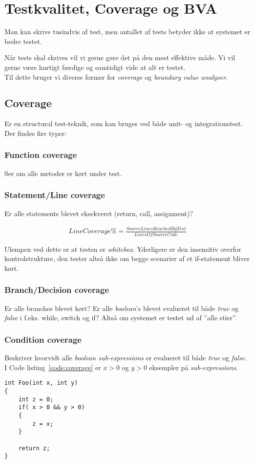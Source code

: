 \section{Testkvalitet, Coverage og BVA}

Man kan skrive tusindvis af test, men antallet af tests betyder ikke at systemet er bedre testet. 

Når tests skal skrives vil vi gerne gøre det på den mest effektive måde. Vi vil gerne være hurtigt færdige og samtidigt vide at alt er testet.\\

Til dette bruger vi diverse former for \textit{coverage} og \textit{boundary value analyser}.

\subsection{Coverage}
Er en structural test-teknik, som kan bruges ved både unit- og integrationstest. Der findes fire typer:

\subsubsection{Function coverage} 
Ser om alle metoder er kørt under test.

\subsubsection{Statement/Line coverage} 
Er alle statements blevet eksekveret (return, call, assignment)? 

\begin{align}
	Line Coverage \% = \frac{Source Lines Reached By Test}{Lines Of Source Code}
\end{align}

Ulempen ved dette er at testen er \textit{whitebox}. Yderligere er den insensitiv overfor kontrolstrukture, den tester altså ikke om begge scenarier af et if-statement bliver kørt.

\subsubsection{Branch/Decision coverage}
Er alle branches blevet kørt? Er alle \textit{boolean}'s blevet evalueret til både \textit{true} og \textit{false} i f.eks. while, switch og if? Altså om systemet er testet ud af ''alle stier''.

\subsubsection{Condition coverage}
Beskriver hvorvidt alle \textit{boolean sub-expressions} er evalueret til både \textit{true} og \textit{false}. I Code listing~\ref{code:coverage} er $x > 0$ og $y > 0$ eksempler på \textit{sub-expressions}.

\begin{lstlisting}[caption=Eksempel vis div. coverage typer.,label=code:coverage]
int Foo(int x, int y)
{
	int z = 0;	
	if( x > 0 && y > 0)
	{
		z = x;
	}
	
	return z;
}
\end{lstlisting}